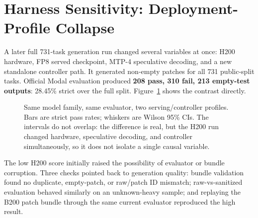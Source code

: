 \documentclass[11pt]{article}
\begin{document}
\section{Harness Sensitivity: Deployment-Profile Collapse}

A later full 731-task generation run changed several variables at once: H200 hardware, FP8 served checkpoint, MTP-4 speculative decoding, and a new standalone controller path. It generated non-empty patches for all 731 public-split tasks. Official Modal evaluation produced \textbf{208 pass, 310 fail, 213 empty-test outputs}: 28.45\% strict over the full split. Figure~\ref{fig:profiles} shows the contrast directly.

\begin{figure}[H]
\centering
{}
\caption{Same model family, same evaluator, two serving/controller profiles. Bars are strict pass rates; whiskers are Wilson 95\% CIs. The intervals do not overlap: the difference is real, but the H200 run changed hardware, speculative decoding, and controller simultaneously, so it does not isolate a single causal variable.}
\label{fig:profiles}
\end{figure}

The low H200 score initially raised the possibility of evaluator or bundle corruption. Three checks pointed back to generation quality: bundle validation found no duplicate, empty-patch, or raw/patch ID mismatch; raw-vs-sanitized evaluation behaved similarly on an unknown-heavy sample; and replaying the B200 patch bundle through the same current evaluator reproduced the high result.
\end{document}
